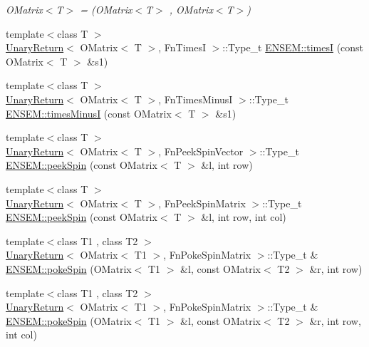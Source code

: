 \begin{DoxyCompactItemize}
\begin{DoxyCompactList}\small\item\em O\+Matrix$<$\+T$>$ = (O\+Matrix$<$\+T$>$ , O\+Matrix$<$\+T$>$) \end{DoxyCompactList}\item 
{\footnotesize template$<$class T $>$ }\\\mbox{\hyperlink{structUnaryReturn}{Unary\+Return}}$<$ O\+Matrix$<$ T $>$, Fn\+TimesI $>$\+::Type\+\_\+t \mbox{\hyperlink{group__obsmatrix_ga988cbbcb7d182905bfc7bf8cda7543cf}{E\+N\+S\+E\+M\+::timesI}} (const O\+Matrix$<$ T $>$ \&s1)
\item 
{\footnotesize template$<$class T $>$ }\\\mbox{\hyperlink{structUnaryReturn}{Unary\+Return}}$<$ O\+Matrix$<$ T $>$, Fn\+Times\+MinusI $>$\+::Type\+\_\+t \mbox{\hyperlink{group__obsmatrix_ga2c4879d53ca01a4233b94574e3c93b4f}{E\+N\+S\+E\+M\+::times\+MinusI}} (const O\+Matrix$<$ T $>$ \&s1)
\item 
{\footnotesize template$<$class T $>$ }\\\mbox{\hyperlink{structUnaryReturn}{Unary\+Return}}$<$ O\+Matrix$<$ T $>$, Fn\+Peek\+Spin\+Vector $>$\+::Type\+\_\+t \mbox{\hyperlink{group__obsmatrix_ga4d21a5274ec8135eea719a150bed1f7a}{E\+N\+S\+E\+M\+::peek\+Spin}} (const O\+Matrix$<$ T $>$ \&l, int row)
\item 
{\footnotesize template$<$class T $>$ }\\\mbox{\hyperlink{structUnaryReturn}{Unary\+Return}}$<$ O\+Matrix$<$ T $>$, Fn\+Peek\+Spin\+Matrix $>$\+::Type\+\_\+t \mbox{\hyperlink{group__obsmatrix_ga5d47056fa4fb3fad4e48957e55c3cdec}{E\+N\+S\+E\+M\+::peek\+Spin}} (const O\+Matrix$<$ T $>$ \&l, int row, int col)
\item 
{\footnotesize template$<$class T1 , class T2 $>$ }\\\mbox{\hyperlink{structUnaryReturn}{Unary\+Return}}$<$ O\+Matrix$<$ T1 $>$, Fn\+Poke\+Spin\+Matrix $>$\+::Type\+\_\+t \& \mbox{\hyperlink{group__obsmatrix_ga45420280324408e59bcbaca0ead5aa55}{E\+N\+S\+E\+M\+::poke\+Spin}} (O\+Matrix$<$ T1 $>$ \&l, const O\+Matrix$<$ T2 $>$ \&r, int row)
\item 
{\footnotesize template$<$class T1 , class T2 $>$ }\\\mbox{\hyperlink{structUnaryReturn}{Unary\+Return}}$<$ O\+Matrix$<$ T1 $>$, Fn\+Poke\+Spin\+Matrix $>$\+::Type\+\_\+t \& \mbox{\hyperlink{group__obsmatrix_gade958f6bfe55cda547000e6badb137c7}{E\+N\+S\+E\+M\+::poke\+Spin}} (O\+Matrix$<$ T1 $>$ \&l, const O\+Matrix$<$ T2 $>$ \&r, int row, int col)

\end{DoxyCompactItemize}
